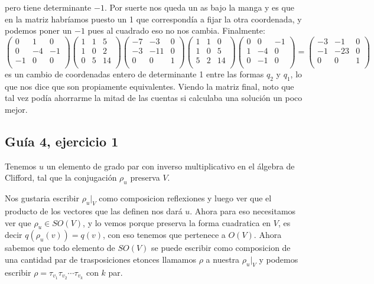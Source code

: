\documentclass[12pt]{amsart}
\newcommand{\lp}{\left(}
\newcommand{\rp}{\right)}
\theoremstyle{plain}
\begin{document}
pero tiene determinante $-1$. Por suerte nos queda un as 
bajo la manga y es que en la matriz habríamos puesto un 1
que correspondía a fijar la otra coordenada, y podemos poner
un $-1$ pues al cuadrado eso no nos cambia. Finalmente:
$$\lp\begin{matrix}
    0&1&0 \\
    0&-4&-1 \\
    -1&0&0 \\
\end{matrix}\rp
\lp\begin{matrix}
    1&1&5 \\
    1&0&2 \\
    0&5&14 \\
\end{matrix}\rp
\lp\begin{matrix}
    -7&-3&0 \\
    -3&-11&0 \\
    0&0&1 \\
\end{matrix}\rp
\lp\begin{matrix}
    1&1&0 \\
    1&0&5 \\
    5&2&14 \\
\end{matrix}\rp
\lp\begin{matrix}
    0&0&-1 \\
    1&-4&0 \\
    0&-1&0 \\
\end{matrix}\rp = 
\lp\begin{matrix}
    -3&-1&0 \\
    -1&-23&0 \\
    0&0&1 \\
\end{matrix}\rp$$
es un cambio de coordenadas entero de determinante 1 entre
las formas $q_2$ y $q_1$, lo que nos dice que son propiamente
equivalentes. Viendo la matriz final, noto que tal vez podía 
ahorrarme la mitad de las cuentas si calculaba una solución 
un poco mejor.


\subsection*{Guía 4, ejercicio 1} Tenemos $u$ un elemento de grado 
par con inverso multiplicativo en el álgebra de Clifford, tal que 
la conjugación $\rho_u$ preserva $V$. 

Nos gustaria escribir $\rho_u|_V$ como composicion reflexiones y luego 
ver que el producto de los vectores que las definen nos dará $u$.
Ahora para eso necesitamos ver que $\rho_u\in SO(V)$, y lo vemos 
porque preserva la forma cuadratica en $V$, es decir $q(\rho_u(v))
=q(v)$, con eso tenemos que pertenece a $O(V)$. 
Ahora sabemos que todo elemento
de $SO(V)$ se puede escribir como composicion de una cantidad par de 
trasposiciones etonces llamamos $\rho$ a nuestra $\rho_u|_V$ y podemos
escribir $\rho=\tau_{v_1}\tau_{v_2}\cdots\tau_{v_k}$ con $k$ par.
\end{document}
